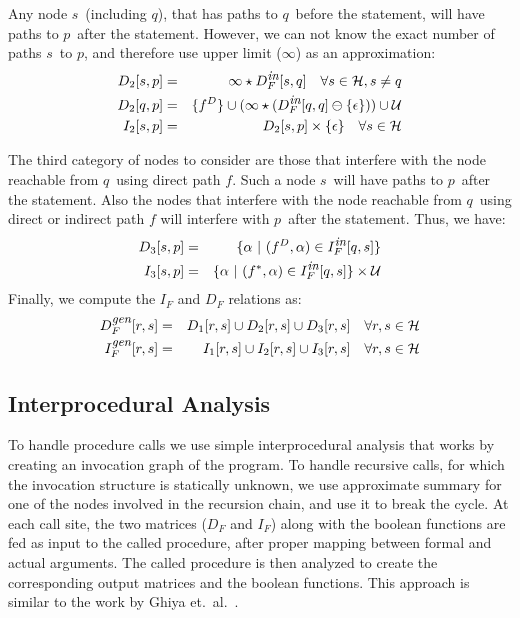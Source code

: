\documentclass{sig-alternate}
\newcommand{\p}{\ensuremath{p}}
\newcommand{\q}{\ensuremath{q}}
\newcommand{\s}{\ensuremath{s}}
\newcommand{\myr}{\ensuremath{r}}
\newcommand{\drct}{\ensuremath{D}}
\newcommand{\heap}{\ensuremath{\mathcal{H}}}
\newcommand{\upath}{\ensuremath{\mathcal{U}}}
\newcommand{\epsilonset}{\ensuremath{\{\epsilon\}}}
\newcommand{\din}{\mbox{\footnotesize\em in}}
\newcommand{\dgen}{\mbox{\footnotesize\em gen}}
\newcommand{\remOne}[2]{\ensuremath{#1 \ominus #2}}
\begin{document}
\begin{enumerate}
Any node \s\ (including \q), that has paths to \q\ before the
statement, will have paths to \p\ after the
statement. However, we can not know the exact number of paths
\s\ to \p, and therefore use upper limit ($\infty$) as an
approximation:
\begin{eqnarray*}
  D_2[\s, \p] &=& \infty \star D_F^{\din}[\s, \q] \quad
  \forall \s \in \heap, \s \not=\q \\
  {D_2[\q,\p]} &=& \{ f^{\drct}\} \cup (\infty \star (\remOne{D_F^{\din}[\q, \q]}{\epsilonset})) \cup \upath  \\ 
  I_2[\s, \p] &=& D_2[\s, \p] \times
  \epsilonset \quad \forall \s \in \heap 
\end{eqnarray*}

The third category of nodes to consider are those that
interfere with the node reachable from \q\ using direct path
$f$. Such a node \s\ will have paths to \p\ after the
statement. Also the nodes that interfere with the node reachable from \q\ using direct or indirect path
$f$ will interfere with \p\ after the statement. Thus, we have:
\begin{eqnarray*}
  D_3[\s, \p] &=& \{ \alpha \ \vert \ (f^{\drct}, \alpha) \in I_F^{\din}[\q, \s] \}  \\
  I_3[\s, \p] &=& \{\alpha \ \vert\ (f^\anysup, \alpha) \in I_F^{\din}[\q, \s]\} \times \upath 
\end{eqnarray*}
Finally, we compute the $I_F$ and $D_F$ relations as:
\begin{eqnarray*}
D_F^{\dgen}[\myr, \s] &= & D_1[\myr, \s] \cup D_2[\myr, \s] \cup D_3[\myr, \s] \quad \forall\myr,\s \in \heap  \\
I_F^{\dgen}[\myr, \s] &= & I_1[\myr, \s] \cup I_2[\myr, \s] \cup I_3[\myr, \s] \quad \forall\myr,\s \in \heap 
\end{eqnarray*}
\end{enumerate}

\subsection{Interprocedural Analysis}
\label{Interprocedural_Analysis}
To handle procedure calls we use simple interprocedural
analysis that works by creating an invocation graph of the
program. To handle recursive calls, for which the invocation
structure is statically unknown, we use approximate summary
for one of the nodes involved in the recursion chain, and use
it to break the cycle. At each call site, the two matrices
($D_F$ and $I_F$) along with the boolean functions are fed as
input to the called procedure, after proper mapping between
formal and actual arguments. The called procedure is then
analyzed to create the corresponding output matrices and the
boolean functions. This approach is similar to the work by
Ghiya et.~al.~\cite{Ghiya96}.
\end{document}
